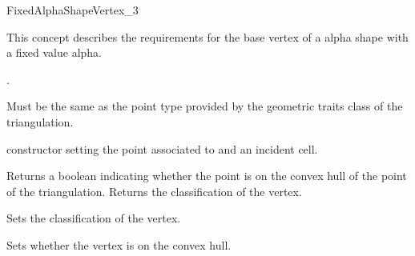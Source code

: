 
\begin{ccRefConcept}{FixedAlphaShapeVertex_3}

\ccDefinition
This concept describes the requirements for the base vertex of a alpha shape with a fixed value alpha.


\ccRefines
{}.


\ccTypes
{}
{Must be the same as the point type provided by  
the geometric traits class of the triangulation.} 

\ccCreation
{}
\ccGlue
{}
\ccGlue
{} 
{constructor setting the point  associated to and an incident cell.}


\ccAccessFunctions
{}
{Returns a boolean indicating whether the point is on the convex hull of the point of the triangulation.}
{Returns the classification of the vertex.}


\ccModifiers
{}
{Sets the classification of the vertex.}

{Sets whether the vertex is on the convex hull.}


\end{ccRefConcept}
